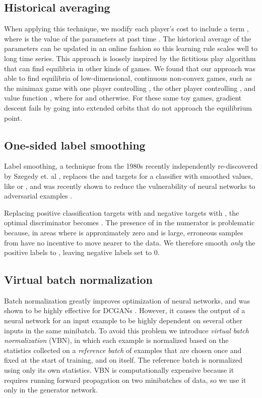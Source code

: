 \documentclass{article} \usepackage{nips14submit_e,times}
\begin{document}
\subsection{Historical averaging}
When applying this technique, we modify each player's cost to include
a term ,
where  is the value of the parameters at past time .
The historical average of the parameters can be updated in an online fashion
so this learning rule scales well to long time series.
This approach is loosely inspired by the fictitious play \cite{brown1951iterative}
algorithm that can find equilibria in other kinds of games.
We found that our approach was able to find equilibria of low-dimensional,
continuous non-convex games, such as the minimax game with one player controlling 
, the other player controlling , and value function ,
where  for  and  otherwise.
For these same toy games, gradient descent fails by going into extended orbits
that do not approach the equilibrium point.


\subsection{One-sided label smoothing}
Label smoothing, a technique from the 1980s
recently independently re-discovered by Szegedy et. al \cite{Szegedy-et-al-2015},
replaces the  and  targets for a classifier with smoothed values, like 
or , and was recently shown to reduce the vulnerability of neural networks
to adversarial examples \cite{wardefarley2016}.

Replacing positive classification targets with  and negative targets with , the optimal discriminator becomes
.
The presence of  in the numerator is problematic because, in areas where
 is approximately zero and  is large, erroneous samples from
 have no incentive to move nearer to the data.
We therefore smooth {\em only} the positive labels to , leaving negative
labels set to 0.


\subsection{Virtual batch normalization}
Batch normalization greatly improves
optimization of neural networks, and was shown to be highly effective for
DCGANs \cite{radford2015unsupervised}.
However, it causes the output of a neural network for an input example  to be
highly dependent on several other inputs  in the same minibatch.
To avoid this problem we introduce {\em virtual batch normalization} (VBN),
in which each example  is normalized based on the statistics collected
on a {\em reference batch} of examples that are chosen once and fixed at the
start of training, and on  itself.
The reference batch is normalized using only its own statistics.
VBN is computationally expensive because it requires running forward propagation on two minibatches
of data, so we use it only in the generator network. 
\end{document}

